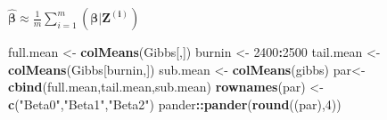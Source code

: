\documentclass[
]{article}
\newenvironment{Shaded}{\begin{snugshade}}{\end{snugshade}}
\newcommand{\DecValTok}[1]{\textcolor[rgb]{0.00,0.00,0.81}{#1}}
\newcommand{\KeywordTok}[1]{\textcolor[rgb]{0.13,0.29,0.53}{\textbf{#1}}}
\newcommand{\NormalTok}[1]{#1}
\newcommand{\OperatorTok}[1]{\textcolor[rgb]{0.81,0.36,0.00}{\textbf{#1}}}
\newcommand{\StringTok}[1]{\textcolor[rgb]{0.31,0.60,0.02}{#1}}
\begin{document}
\(\boldsymbol{\hat\beta}\approx\frac1m\sum_{i=1}^m(\boldsymbol{\beta|Z^{(i)}})\)

\begin{Shaded}
\begin{Highlighting}[]
\NormalTok{full.mean <-}\StringTok{ }\KeywordTok{colMeans}\NormalTok{(Gibbs[,])}
\NormalTok{burnin <-}\StringTok{ }\DecValTok{2400}\OperatorTok{:}\DecValTok{2500}
\NormalTok{tail.mean <-}\StringTok{ }\KeywordTok{colMeans}\NormalTok{(Gibbs[burnin,])}
\NormalTok{sub.mean <-}\StringTok{ }\KeywordTok{colMeans}\NormalTok{(gibbs)}
\NormalTok{par<-}\StringTok{ }\KeywordTok{cbind}\NormalTok{(full.mean,tail.mean,sub.mean)}
\KeywordTok{rownames}\NormalTok{(par) <-}\StringTok{ }\KeywordTok{c}\NormalTok{(}\StringTok{"Beta0"}\NormalTok{,}\StringTok{"Beta1"}\NormalTok{,}\StringTok{"Beta2"}\NormalTok{)}
\NormalTok{pander}\OperatorTok{::}\KeywordTok{pander}\NormalTok{(}\KeywordTok{round}\NormalTok{((par),}\DecValTok{4}\NormalTok{))}
\end{Highlighting}
\end{Shaded}
\end{document}
